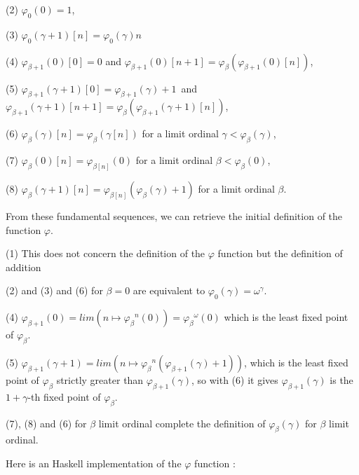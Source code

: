 \documentclass[10pt]{article}
\begin{document}
(2) \(\varphi_0(0) = 1\),

(3) \(\varphi_0(\gamma+1) [n] = \varphi_0(\gamma) n\)

(4) \(\varphi_{\beta+1}(0) [0] = 0 \) and \(\varphi_{\beta+1}(0) [n+1] = \varphi_{\beta}(\varphi_{\beta+1}(0) [n]) \),

(5) \(\varphi_{\beta+1}(\gamma+1) [0] = \varphi_{\beta+1}(\gamma)+1 \,\) and \(\varphi_{\beta+1}(\gamma+1) [n+1] = \varphi_{\beta} (\varphi_{\beta+1}(\gamma+1) [n]) \),

(6) \(\varphi_{\beta}(\gamma) [n] = \varphi_{\beta}(\gamma [n])\) for a limit ordinal \(\gamma<\varphi_\beta(\gamma)\),

(7) \(\varphi_{\beta}(0) [n] = \varphi_{\beta [n]}(0)\) for a limit ordinal \(\beta<\varphi_\beta(0)\),

(8) \(\varphi_{\beta}(\gamma+1) [n] = \varphi_{\beta [n]}(\varphi_{\beta}(\gamma)+1)\) for a limit ordinal \(\beta\).

\bigskip

From these fundamental sequences, we can retrieve the initial definition of the function \( \varphi \).

\bigskip

(1) This does not concern the definition of the \( \varphi \) function but the definition of addition

(2) and (3) and (6) for \( \beta = 0 \) are equivalent to \( \varphi_0(\gamma) = \omega^\gamma \).

(4) \( \varphi_{\beta+1}(0) = lim (n \mapsto {\varphi_\beta}^n(0)) = {\varphi_\beta}^\omega(0) \) which is the least fixed point of \( \varphi_\beta \).

(5) \( \varphi_{\beta+1}(\gamma+1) = lim (n \mapsto {\varphi_\beta}^n (\varphi_{\beta+1}(\gamma)+1)) \), which is the least fixed point of \( \varphi_\beta \) strictly greater than \( \varphi_{\beta+1}(\gamma) \), so with (6) it gives \( \varphi_{\beta+1}(\gamma) \) is the \(1+\gamma\)-th fixed point of \( \varphi_\beta \).

(7), (8) and (6) for \( \beta \) limit ordinal complete the definition of \( \varphi_\beta(\gamma) \) for \( \beta \) limit ordinal.

\bigskip

Here is an Haskell implementation of the \( \varphi \) function : 
\end{document}
